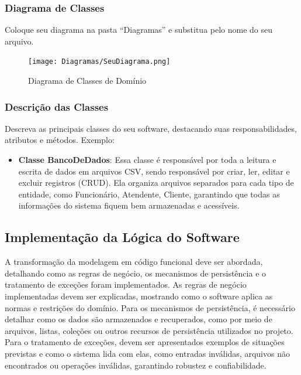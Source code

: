 \documentclass{article}
\begin{document}
\subsubsection{Diagrama de Classes}

Coloque seu diagrama na pasta ``Diagramas'' e substitua pelo nome do seu arquivo.

\vspace{10mm}
\begin{figure}[H]
    \centering
    \texttt{[image: Diagramas/SeuDiagrama.png]} %
    \caption{Diagrama de Classes de Domínio}
    \label{fig:diagrama}
\end{figure}


\subsubsection*{Descrição das Classes}

Descreva as principais classes do seu software, destacando suas responsabilidades, atributos e métodos. Exemplo:
    
\begin{itemize}
    \item\textbf{Classe BancoDeDados}:
    Essa classe é responsável por toda a leitura e escrita de dados em arquivos CSV, sendo responsável por criar, ler, editar e excluir registros (CRUD). Ela organiza arquivos separados para cada tipo de entidade, como Funcionário, Atendente, Cliente, garantindo que todas as informações do sistema fiquem bem armazenadas e acessíveis.
\end{itemize}


\subsection{Implementação da Lógica do Software}

A transformação da modelagem em código funcional deve ser abordada, detalhando como as regras de negócio, os mecanismos de persistência e o tratamento de exceções foram implementados. As regras de negócio implementadas devem ser explicadas, mostrando como o software aplica as normas e restrições do domínio. Para os mecanismos de persistência, é necessário detalhar como os dados são armazenados e recuperados, como por meio de arquivos, listas, coleções ou outros recursos de persistência utilizados no projeto. Para o tratamento de exceções, devem ser apresentados exemplos de situações previstas e como o sistema lida com elas, como entradas inválidas, arquivos não encontrados ou operações inválidas, garantindo robustez e confiabilidade.
\end{document}
